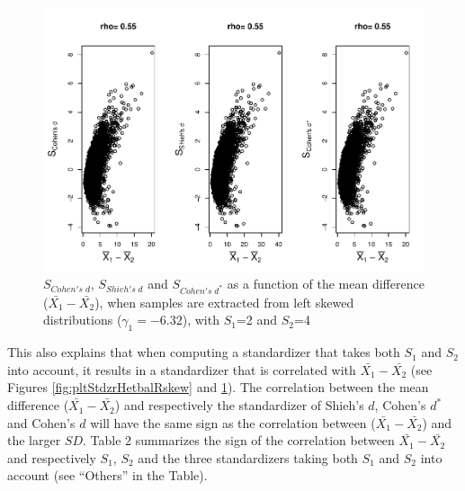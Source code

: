 \documentclass[
  english,
  man,mask,floatsintext]{apa6}
\begin{document}
\begin{figure}
\centering
\includegraphics{Correlation_files/figure-latex/pltStdzrHetbalLskew-1.pdf}
\caption{\label{fig:pltStdzrHetbalLskew}\(S_{Cohen's \; d}\), \(S_{Shieh's \; d}\) and \(S_{Cohen's \; d^*}\) as a function of the mean difference (\(\bar{X_1}-\bar{X_2}\)), when samples are extracted from left skewed distributions (\(\gamma_1 = -6.32\)), with \(S_1\)=2 and \(S_2\)=4}
\end{figure}

This also explains that when computing a standardizer that takes both \(S_1\) and \(S_2\) into account, it results in a standardizer that is correlated with \(\bar{X_1}-\bar{X_2}\) (see Figures \ref{fig:pltStdzrHetbalRskew} and \ref{fig:pltStdzrHetbalLskew}). The correlation between the mean difference (\(\bar{X_1}-\bar{X_2}\)) and respectively the standardizer of Shieh's \(d\), Cohen's \(d^*\) and Cohen's \(d\) will have the same sign as the correlation between (\(\bar{X_1}-\bar{X_2}\)) and the larger \(SD\). Table 2 summarizes the sign of the correlation between \(\bar{X_1}-\bar{X_2}\) and respectively \(S_1\), \(S_2\) and the three standardizers taking both \(S_1\) and \(S_2\) into account (see ``Others'' in the Table).
\end{document}
